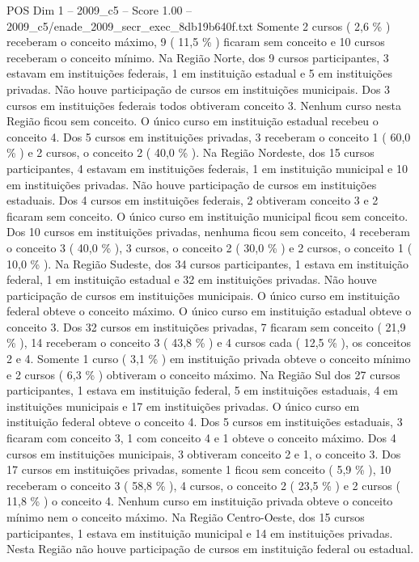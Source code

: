 \begin{textsample}{POS Dim 1 – 2009\_c5 – Score 1.00 – 2009\_c5/enade\_2009\_secr\_exec\_8db19b640f.txt}
Somente 2 cursos ( 2,6 \% ) receberam o conceito máximo, 9 ( 11,5 \% ) ficaram sem conceito e 10 cursos receberam o conceito mínimo.
Na Região Norte, dos 9 cursos participantes, 3 estavam em instituições federais, 1 em instituição estadual e 5 em instituições privadas.
Não houve participação de cursos em instituições municipais.
Dos 3 cursos em instituições federais todos obtiveram conceito 3.
Nenhum curso nesta Região ficou sem conceito.
O único curso em instituição estadual recebeu o conceito 4.
Dos 5 cursos em instituições privadas, 3 receberam o conceito 1 ( 60,0 \% ) e 2 cursos, o conceito 2 ( 40,0 \% ).
Na Região Nordeste, dos 15 cursos participantes, 4 estavam em instituições federais, 1 em instituição municipal e 10 em instituições privadas.
Não houve participação de cursos em instituições estaduais.
Dos 4 cursos em instituições federais, 2 obtiveram conceito 3 e 2 ficaram sem conceito.
O único curso em instituição municipal ficou sem conceito.
Dos 10 cursos em instituições privadas, nenhuma ficou sem conceito, 4 receberam o conceito 3 ( 40,0 \% ), 3 cursos, o conceito 2 ( 30,0 \% ) e 2 cursos, o conceito 1 ( 10,0 \% ).
Na Região Sudeste, dos 34 cursos participantes, 1 estava em instituição federal, 1 em instituição estadual e 32 em instituições privadas.
Não houve participação de cursos em instituições municipais.
O único curso em instituição federal obteve o conceito máximo.
O único curso em instituição estadual obteve o conceito 3.
Dos 32 cursos em instituições privadas, 7 ficaram sem conceito ( 21,9 \% ), 14 receberam o conceito 3 ( 43,8 \% ) e 4 cursos cada ( 12,5 \% ), os conceitos 2 e 4.
Somente 1 curso ( 3,1 \% ) em instituição privada obteve o conceito mínimo e 2 cursos ( 6,3 \% ) obtiveram o conceito máximo.
Na Região Sul dos 27 cursos participantes, 1 estava em instituição federal, 5 em instituições estaduais, 4 em instituições municipais e 17 em instituições privadas.
O único curso em instituição federal obteve o conceito 4.
Dos 5 cursos em instituições estaduais, 3 ficaram com conceito 3, 1 com conceito 4 e 1 obteve o conceito máximo.
Dos 4 cursos em instituições municipais, 3 obtiveram conceito 2 e 1, o conceito 3.
Dos 17 cursos em instituições privadas, somente 1 ficou sem conceito ( 5,9 \% ), 10 receberam o conceito 3 ( 58,8 \% ), 4 cursos, o conceito 2 ( 23,5 \% ) e 2 cursos ( 11,8 \% ) o conceito 4.
Nenhum curso em instituição privada obteve o conceito mínimo nem o conceito máximo.
Na Região Centro-Oeste, dos 15 cursos participantes, 1 estava em instituição municipal e 14 em instituições privadas.
Nesta Região não houve participação de cursos em instituição federal ou estadual.

\end{textsample}
